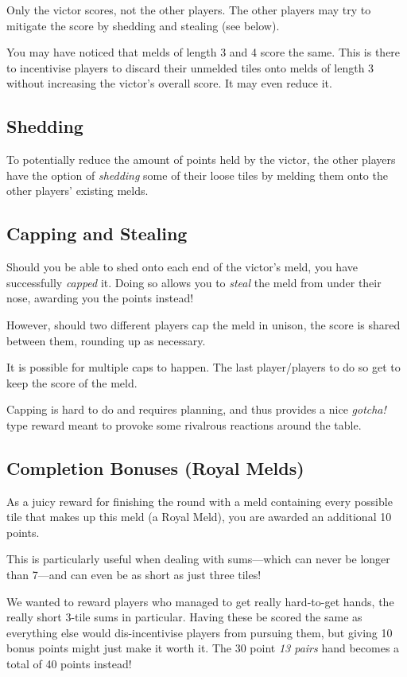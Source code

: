 \note Only the victor scores, not the other players. The other players may try to mitigate the score by shedding and stealing (see below).

\aside You may have noticed that melds of length 3 and 4 score the same. This is there to incentivise players to discard their unmelded tiles onto melds of length 3 without increasing the victor's overall score. It may even reduce it.

\subsection{Shedding}
To potentially reduce the amount of points held by the victor, the other players have the option of \textit{shedding} some of their loose tiles by melding them onto the other players' existing melds.

\subsection{Capping and Stealing}
Should you be able to shed onto each end of the victor's meld, you have successfully \textit{capped} it. Doing so allows you to \textit{steal} the meld from under their nose, awarding you the points instead!

However, should two different players cap the meld in unison, the score is shared between them, rounding up as necessary.

\note It is possible for multiple caps to happen. The last player/players to do so get to keep the score of the meld.

\aside Capping is hard to do and requires planning, and thus provides a nice \textit{gotcha!} type reward meant to provoke some rivalrous reactions around the table.

\subsection{Completion Bonuses (Royal Melds)}
As a juicy reward for finishing the round with a meld containing every possible tile that makes up this meld (a Royal Meld), you are awarded an additional 10 points.

This is particularly useful when dealing with sums---which can never be longer than 7---and can even be as short as just three tiles!

\aside We wanted to reward players who managed to get really hard-to-get hands, the really short 3-tile sums in particular. Having these be scored the same as everything else would dis-incentivise players from pursuing them, but giving 10 bonus points might just make it worth it. The 30 point \textit{13 pairs} hand becomes a total of 40 points instead!

